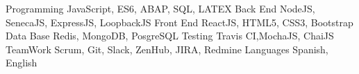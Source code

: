 


\begin{cvskills}

\cvskill
{Programming} %
{JavaScript, ES6, ABAP, SQL, LATEX} %
\cvskill
{Back End} %
{NodeJS,  SenecaJS, ExpressJS, LoopbackJS} %
\cvskill
{Front End} %
{ReactJS, HTML5, CSS3, Bootstrap} %
\cvskill
{Data Base} %
{Redis, MongoDB, PosgreSQL} %
\cvskill
{Testing} %
{Travis CI,MochaJS, ChaiJS} %
\cvskill
{TeamWork} %
{Scrum, Git, Slack, ZenHub, JIRA, Redmine} %
\cvskill
{Languages} %
{Spanish, English} %
\end{cvskills}
